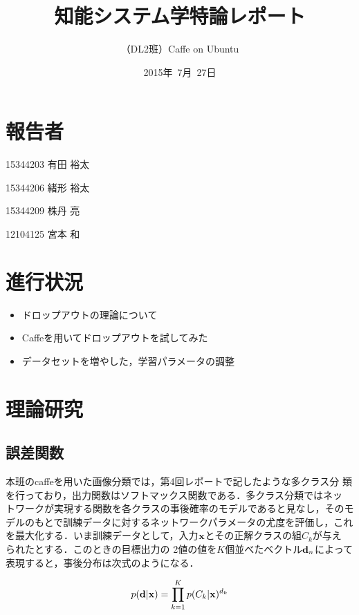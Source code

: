 \documentclass[a4paper,10pt]{jsarticle}
\title{知能システム学特論レポート}
\author{
（DL2班）Caffe on Ubuntu\\
}
\date{2015年\ 7月\ 27日}
\begin{document}
\maketitle
\section{報告者}
\begin{list}{}{}
 \item 15344203\hspace{0.5cm} 有田 裕太
 \item 15344206\hspace{0.5cm} 緒形 裕太
 \item 15344209\hspace{0.5cm} 株丹 亮
 \item 12104125\hspace{0.5cm} 宮本 和
\end{list}

\section{進行状況}

\begin{itemize}
\item ドロップアウトの理論について
\item Caffeを用いてドロップアウトを試してみた
\item データセットを増やした，学習パラメータの調整
\end{itemize}

\section{理論研究}

\subsection{誤差関数}
本班のcaffeを用いた画像分類では，第4回レポートで記したような多クラス分
類を行っており，出力関数はソフトマックス関数である．多クラス分類ではネッ
トワークが実現する関数を各クラスの事後確率のモデルであると見なし，そのモ
デルのもとで訓練データに対するネットワークパラメータの尤度を評価し，これ
を最大化する．いま訓練データとして，入力${\bf x}$とその正解クラスの組$C_k$が与え
られたとする．このときの目標出力の
2値の値を$K$個並べたベクトル${\bf
d}_n$によって表現すると，事後分布は次式のようになる．

\begin{equation}
 p({\bf d}|{\bf x}) = \prod_{k=1}^{K}p(C_k|{\bf x})^{d_k}
\end{equation}
\end{document}
